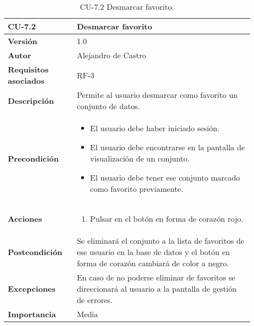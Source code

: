\begin{table}[p]
	\centering
	\begin{tabularx}{\linewidth}{ p{} p{} }
		\toprule
		\textbf{CU-7.2}    & \textbf{Desmarcar favorito}\\
		\toprule
		\textbf{Versión}              & 1.0    \\
		\textbf{Autor}                & {Alejandro de Castro} \\
		\textbf{Requisitos asociados} & RF-3 \\
		\textbf{Descripción}          & Permite al usuario desmarcar como favorito un conjunto de datos. \\
		\textbf{Precondición}         & \begin{itemize}
		    \item El usuario debe haber iniciado sesión. 
            \item El usuario debe encontrarse en la pantalla de visualización de un conjunto. 
            \item El usuario debe tener ese conjunto marcado como favorito previamente. 
		\end{itemize} \\
        \textbf{Acciones}             &
		\begin{enumerate}
			\def\labelenumi{\arabic{enumi}.}
			\tightlist
			\item Pulsar en el botón en forma de corazón rojo.
		\end{enumerate}\\ 
		\textbf{Postcondición}        & Se eliminará el conjunto a la lista de favoritos de ese usuario en la base de datos y el botón en forma de corazón cambiará de color a negro. \\
		\textbf{Excepciones}          & En caso de no poderse eliminar de favoritos se direccionará al usuario a la pantalla de gestión de errores. \\
		\textbf{Importancia}          & Media \\
		\bottomrule
	\end{tabularx}
	\caption{CU-7.2 Desmarcar favorito.}
\end{table}

